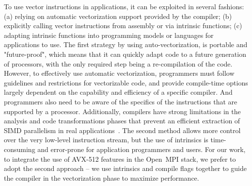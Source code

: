 \documentclass[5p,times,twocolumn]{elsarticle}
\newcommand{\ompi}[0]{Open~MPI\xspace}
\begin{document}
To use vector instructions in applications, it can be exploited in several fashions:
(a) relying on automatic vectorization support provided by the compiler;
(b) explicitly calling vector instructions from assembly or via intrinsic functions;
(c) adapting intrinsic functions into programming models or languages
for applications to use.
%
The first strategy by using auto-vectorization, is portable and
"future-proof", which means that it can quickly adapt code to a future
generation of processors, with the only required step being a
re-compilation of the code. However, to effectively use automatic
vectorization, programmers must follow guidelines and restrictions for
vectorizable code, and provide compile-time options largely dependent
on the capability and efficiency of a specific compiler.
%
And programmers also need to be aware of the specifics of the
instructions that are supported by a processor.  Additionally,
compilers have strong limitations in the analysis and code
transformations phases that prevent an efficient extraction of SIMD
parallelism in real applications~\cite{autoEvaluation}.
%
The second method allows more control over the very low-level
instruction stream, but the use of intrinsics is time-consuming and
error-prone for application programmers and users.
%
For our work, to integrate the use of AVX-512 features in the \ompi
stack, we prefer to adopt the second approach -- we use intrinsics and
compile flags together to guide the compiler in the vectorization
phase to maximize performance.
\end{document}

